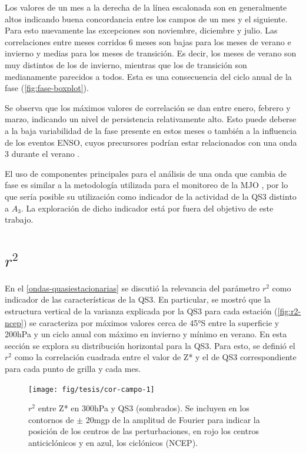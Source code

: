 \documentclass[spanish,a4paper,12pt,oneside]{book}
\begin{document}
Los valores de un mes a la derecha de la línea escalonada son en
generalmente altos indicando buena concordancia entre los campos de un
mes y el siguiente. Para esto nuevamente las excepciones son noviembre,
diciembre y julio. Las correlaciones entre meses corridos 6 meses son
bajas para los meses de verano e invierno y medias para los meses de
transición. Es decir, los meses de verano son muy distintos de los de
invierno, mientras que los de transición son medianamente parecidos a
todos. Esta es una consecuencia del ciclo anual de la fase
(\autoref{fig:fase-boxplot}).

Se observa que los máximos valores de correlación se dan entre enero,
febrero y marzo, indicando un nivel de persistencia relativamente alto.
Esto puede deberse a la baja variabilidad de la fase presente en estos
meses o también a la influencia de los eventos ENSO, cuyos precursores
podrían estar relacionados con una onda 3 durante el verano
\citep{Qin2017}.

El uso de componentes principales para el análisis de una onda que
cambia de fase es similar a la metodología utilizada para el monitoreo
de la MJO \citep{Wheeler2004}, por lo que sería posible su utilización
como indicador de la actividad de la QS3 distinto a \(A_3\). La
exploración de dicho indicador está por fuera del objetivo de este
trabajo.

\section{\texorpdfstring{\(r^2\)}{r\^{}2}}\label{r2}

En el \autoref{ondas-quasiestacionarias} se discutió la relevancia del
parámetro \(r^2\) como indicador de las características de la QS3. En
particular, se mostró que la estructura vertical de la varianza
explicada por la QS3 para cada estación (\autoref{fig:r2-ncep}) se
caracteriza por máximos valores cerca de 45°S entre la superficie y
200hPa y un ciclo anual con máximo en invierno y mínimo en verano. En
esta sección se explora su distribución horizontal para la QS3. Para
esto, se definió el \(r^2\) como la correlación cuadrada entre el valor
de Z* y el de QS3 correspondiente para cada punto de grilla y cada mes.

\begin{figure}
\texttt{[image: fig/tesis/cor-campo-1]} \caption{$r^2$ entre Z* en 300hPa y QS3 (sombrados). Se incluyen en  los contornos de $\pm$ 20mgp de la amplitud de Fourier para indicar la posición de los centros de las perturbaciones, en rojo los centros anticiclónicos y en azul, los ciclónicos (NCEP).}\label{fig:cor-campo}
\end{figure}
\end{document}
